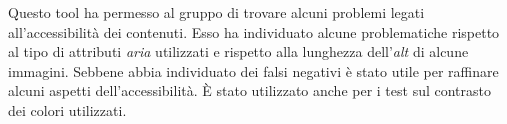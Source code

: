Questo tool ha permesso al gruppo di trovare alcuni problemi legati all'accessibilità dei contenuti. Esso ha individuato alcune problematiche rispetto al tipo di attributi \textit{aria} utilizzati e rispetto alla lunghezza dell'\textit{alt} di alcune immagini. Sebbene abbia individuato dei falsi negativi è stato utile per raffinare alcuni aspetti dell'accessibilità. È stato utilizzato anche per i test sul contrasto dei colori utilizzati.